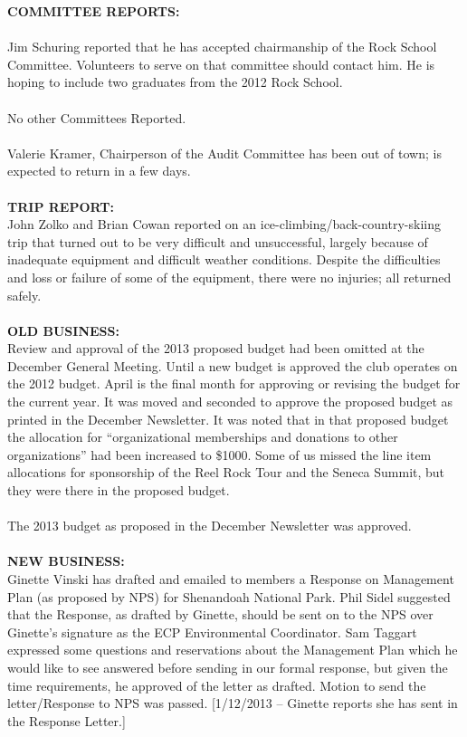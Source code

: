 \documentclass[10pt,a4paper]{article}
\begin{document}
\begin{multicols}{2}
\textbf{COMMITTEE REPORTS:} 
\\
\\
Jim Schuring reported that he has accepted chairmanship of the Rock School Committee. Volunteers to serve on that committee should contact him.  He is hoping to include two graduates from the 2012 Rock School.
\\
\\
No other Committees Reported.
\\
\\
Valerie Kramer, Chairperson of the Audit Committee has been out of town; is expected to return in a few days.
\\
\\
\textbf{TRIP REPORT:}\\
John Zolko and Brian Cowan reported on an ice-climbing/back-country-skiing trip that turned out to be very difficult and unsuccessful, largely because of inadequate equipment and difficult weather conditions.  Despite the difficulties and loss or failure of some of the equipment, there were no injuries; all returned safely.
\\
\\
\textbf{OLD BUSINESS:}\\
Review and approval of the 2013 proposed budget had been omitted at the December General Meeting.   Until a new budget is approved the club operates on the 2012 budget.  April is the final month for approving or revising the budget for the current year.  It was moved and seconded to approve the proposed budget as printed in the December Newsletter.  It was noted that in that proposed budget the allocation for “organizational memberships and donations to other organizations” had been increased to \$1000.  Some of us missed the line item allocations for sponsorship of the Reel Rock Tour and the Seneca Summit, but they were there in the proposed budget.\\
\\
The 2013 budget as proposed in the December Newsletter was approved.
\\
\\
\textbf{NEW BUSINESS:}\\
Ginette Vinski has drafted and emailed to members a Response on Management Plan (as proposed by NPS) for Shenandoah National Park.   Phil Sidel suggested that the Response, as drafted by Ginette, should be sent on to the NPS over Ginette's signature as the ECP Environmental Coordinator.  Sam Taggart expressed some questions and reservations about the Management Plan which he would like to see answered before sending in our formal response, but given the time requirements, he approved of the letter as drafted.   Motion to send the letter/Response to NPS was passed.  [1/12/2013 – Ginette reports she has sent in the Response Letter.]

\end{multicols}
\end{document}
